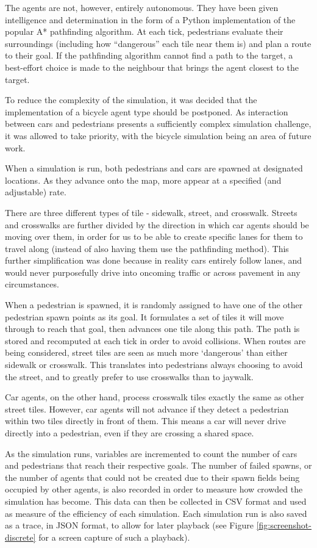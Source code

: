 The agents are not, however, entirely autonomous. They have been given intelligence and determination in the form of a Python implementation of the popular A* pathfinding algorithm. At each tick, pedestrians evaluate their surroundings (including how “dangerous” each tile near them is) and plan a route to their goal. If the pathfinding algorithm cannot find a path to the target, a best-effort choice is made to the neighbour that brings the agent closest to the target.

To reduce the complexity of the simulation, it was decided that the implementation of a bicycle agent type should be postponed. As interaction between cars and pedestrians presents a sufficiently complex simulation challenge, it was allowed to take priority, with the bicycle simulation being an area of future work.

When a simulation is run, both pedestrians and cars are spawned at designated locations. As they advance onto the map, more appear at a specified (and adjustable) rate.

There are three different types of tile - sidewalk, street, and crosswalk. Streets and crosswalks are further divided by the direction in which car agents should be moving over them, in order for us to be able to create specific lanes for them to travel along (instead of also having them use the pathfinding method). This further simplification was done because in reality cars entirely follow lanes, and would never purposefully drive into oncoming traffic or across pavement in any circumstances.

When a pedestrian is spawned, it is randomly assigned to have one of the other pedestrian spawn points as its goal. It formulates a set of tiles it will move through to reach that goal, then advances one tile along this path. The path is stored and recomputed at each tick in order to avoid collisions. When routes are being considered, street tiles are seen as much more ‘dangerous’ than either sidewalk or crosswalk. This translates into pedestrians always choosing to avoid the street, and to greatly prefer to use crosswalks than to jaywalk.

Car agents, on the other hand, process crosswalk tiles exactly the same as other street tiles. However, car agents will not advance if they detect a pedestrian within two tiles directly in front of them. This means a car will never drive directly into a pedestrian, even if they are crossing a shared space.

As the simulation runs, variables are incremented to count the number of cars and pedestrians that reach their respective goals. The number of failed spawns, or the number of agents that could not be created due to their spawn fields being occupied by other agents, is also recorded in order to measure how crowded the simulation has become. This data can then be collected in CSV format and used as measure of the efficiency of each simulation. Each simulation run is also saved as a trace, in JSON format, to allow for later playback (see Figure \ref{fig:screenshot-discrete} for a screen capture of such a playback).

